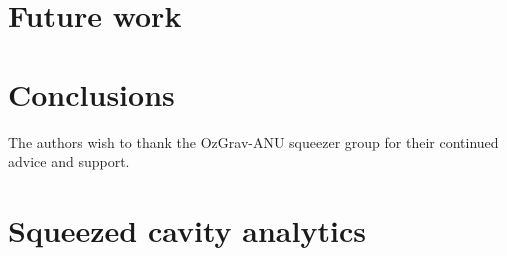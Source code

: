 \documentclass[aps,pra,superscriptaddress,reprint,nofootinbib]{revtex4-1}
\begin{document}
\section{Future work}
\label{sec:future_work}





\section{Conclusions}
\label{sec:conclusions}



\begin{acknowledgments}
The authors wish to thank the OzGrav-ANU squeezer group for their continued advice and support.

\end{acknowledgments}


\appendix
\section{Squeezed cavity analytics}
\label{app:squeezed_cavity_analytics}



\nocite{*}


\end{document}
